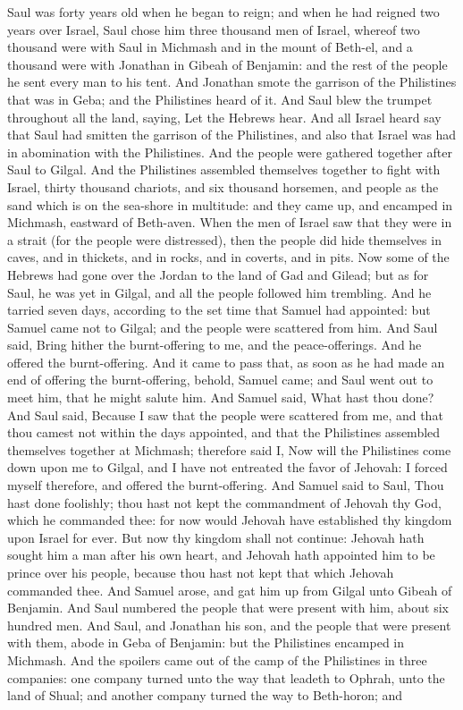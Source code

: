 Saul was forty years old when he began to reign; and when he had reigned two years over Israel, Saul chose him three thousand men of Israel, whereof two thousand were with Saul in Michmash and in the mount of Beth-el, and a thousand were with Jonathan in Gibeah of Benjamin: and the rest of the people he sent every man to his tent. And Jonathan smote the garrison of the Philistines that was in Geba; and the Philistines heard of it. And Saul blew the trumpet throughout all the land, saying, Let the Hebrews hear. And all Israel heard say that Saul had smitten the garrison of the Philistines, and also that Israel was had in abomination with the Philistines. And the people were gathered together after Saul to Gilgal.  And the Philistines assembled themselves together to fight with Israel, thirty thousand chariots, and six thousand horsemen, and people as the sand which is on the sea-shore in multitude: and they came up, and encamped in Michmash, eastward of Beth-aven. When the men of Israel saw that they were in a strait (for the people were distressed), then the people did hide themselves in caves, and in thickets, and in rocks, and in coverts, and in pits. Now some of the Hebrews had gone over the Jordan to the land of Gad and Gilead; but as for Saul, he was yet in Gilgal, and all the people followed him trembling.  And he tarried seven days, according to the set time that Samuel had appointed: but Samuel came not to Gilgal; and the people were scattered from him. And Saul said, Bring hither the burnt-offering to me, and the peace-offerings. And he offered the burnt-offering. And it came to pass that, as soon as he had made an end of offering the burnt-offering, behold, Samuel came; and Saul went out to meet him, that he might salute him. And Samuel said, What hast thou done? And Saul said, Because I saw that the people were scattered from me, and that thou camest not within the days appointed, and that the Philistines assembled themselves together at Michmash; therefore said I, Now will the Philistines come down upon me to Gilgal, and I have not entreated the favor of Jehovah: I forced myself therefore, and offered the burnt-offering. And Samuel said to Saul, Thou hast done foolishly; thou hast not kept the commandment of Jehovah thy God, which he commanded thee: for now would Jehovah have established thy kingdom upon Israel for ever. But now thy kingdom shall not continue: Jehovah hath sought him a man after his own heart, and Jehovah hath appointed him to be prince over his people, because thou hast not kept that which Jehovah commanded thee. And Samuel arose, and gat him up from Gilgal unto Gibeah of Benjamin. And Saul numbered the people that were present with him, about six hundred men. And Saul, and Jonathan his son, and the people that were present with them, abode in Geba of Benjamin: but the Philistines encamped in Michmash. And the spoilers came out of the camp of the Philistines in three companies: one company turned unto the way that leadeth to Ophrah, unto the land of Shual; and another company turned the way to Beth-horon; and 